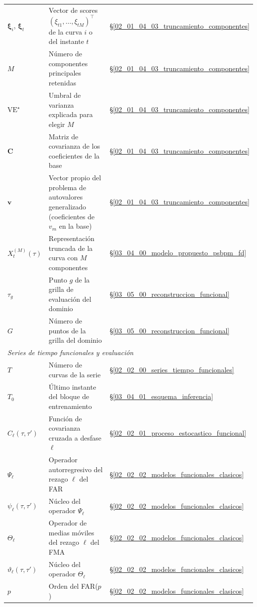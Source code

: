 \begin{longtable}{p{} p{} p{}}
$\boldsymbol{\xi}_i$, $\boldsymbol{\xi}_t$ & Vector de scores $(\xi_{t1}, \dots, \xi_{tM})^\top$ de la curva $i$ o del instante $t$ & \S\ref{02_01_04_03_truncamiento_componentes} \\
$M$ & Número de componentes principales retenidas & \S\ref{02_01_04_03_truncamiento_componentes} \\
$\mathrm{VE}^{\star}$ & Umbral de varianza explicada para elegir $M$ & \S\ref{02_01_04_03_truncamiento_componentes} \\
$\mathbf{C}$ & Matriz de covarianza de los coeficientes de la base & \S\ref{02_01_04_03_truncamiento_componentes} \\
$\mathbf{v}$ & Vector propio del problema de autovalores generalizado (coeficientes de $v_m$ en la base) & \S\ref{02_01_04_03_truncamiento_componentes} \\
$X_t^{(M)}(\tau)$ & Representación truncada de la curva con $M$ componentes & \S\ref{03_04_00_modelo_propuesto_psbpm_fd} \\
$\tau_g$ & Punto $g$ de la grilla de evaluación del dominio & \S\ref{03_05_00_reconstruccion_funcional} \\
$G$ & Número de puntos de la grilla del dominio & \S\ref{03_05_00_reconstruccion_funcional} \\
\hline
\multicolumn{3}{l}{\textit{Series de tiempo funcionales y evaluación}} \\
\hline
$T$ & Número de curvas de la serie & \S\ref{02_02_00_series_tiempo_funcionales} \\
$T_0$ & Último instante del bloque de entrenamiento & \S\ref{03_04_01_esquema_inferencia} \\
$C_\ell(\tau, \tau')$ & Función de covarianza cruzada a desfase $\ell$ & \S\ref{02_02_01_proceso_estocastico_funcional} \\
$\Psi_\ell$ & Operador autorregresivo del rezago $\ell$ del FAR & \S\ref{02_02_02_modelos_funcionales_clasicos} \\
$\psi_\ell(\tau, \tau')$ & Núcleo del operador $\Psi_\ell$ & \S\ref{02_02_02_modelos_funcionales_clasicos} \\
$\Theta_\ell$ & Operador de medias móviles del rezago $\ell$ del FMA & \S\ref{02_02_02_modelos_funcionales_clasicos} \\
$\vartheta_\ell(\tau, \tau')$ & Núcleo del operador $\Theta_\ell$ & \S\ref{02_02_02_modelos_funcionales_clasicos} \\
$p$ & Orden del FAR($p$) & \S\ref{02_02_02_modelos_funcionales_clasicos} \\

\end{longtable}
